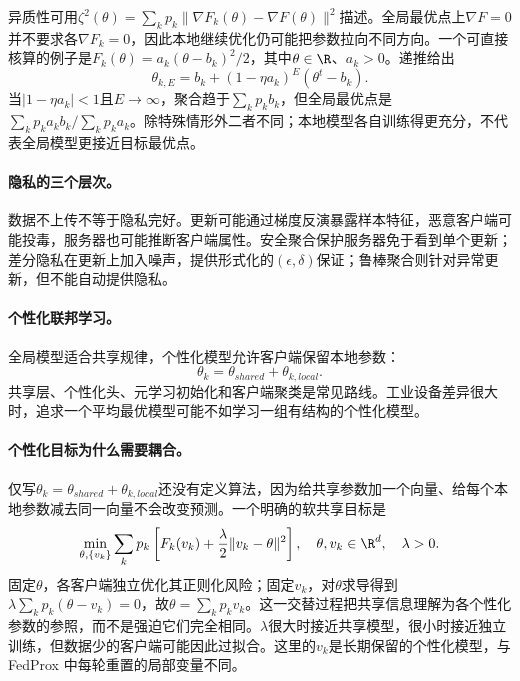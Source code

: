 异质性可用$\zeta^2(\theta)=\sum_kp_k\|\nabla F_k(\theta)-\nabla F(\theta)\|^2$描述。全局最优点上$\nabla F=0$并不要求各$\nabla F_k=0$，因此本地继续优化仍可能把参数拉向不同方向。一个可直接核算的例子是$F_k(\theta)=a_k(\theta-b_k)^2/2$，其中$\theta\in\R$、$a_k>0$。递推给出
\begin{equation}
 \theta_{k,E}=b_k+(1-\eta a_k)^E(\theta^t-b_k).
\end{equation}
当$|1-\eta a_k|<1$且$E\to\infty$，聚合趋于$\sum_kp_kb_k$，但全局最优点是$\sum_kp_ka_kb_k/\sum_kp_ka_k$。除特殊情形外二者不同；本地模型各自训练得更充分，不代表全局模型更接近目标最优点。

\paragraph{隐私的三个层次。}
数据不上传不等于隐私完好。更新可能通过梯度反演暴露样本特征，恶意客户端可能投毒，服务器也可能推断客户端属性。安全聚合保护服务器免于看到单个更新；差分隐私在更新上加入噪声，提供形式化的$(\epsilon,\delta)$保证；鲁棒聚合则针对异常更新，但不能自动提供隐私。

\paragraph{个性化联邦学习。}
全局模型适合共享规律，个性化模型允许客户端保留本地参数：
\begin{equation}
 \theta_k=\theta_{shared}+\theta_{k,local}.
\end{equation}
共享层、个性化头、元学习初始化和客户端聚类是常见路线。工业设备差异很大时，追求一个平均最优模型可能不如学习一组有结构的个性化模型。

\paragraph{个性化目标为什么需要耦合。}
仅写$\theta_k=\theta_{shared}+\theta_{k,local}$还没有定义算法，因为给共享参数加一个向量、给每个本地参数减去同一向量不会改变预测。一个明确的软共享目标是
\begin{equation}
 \min_{\theta,\{v_k\}}\sum_kp_k
 \left[F_k(v_k)+\frac\lambda2\|v_k-\theta\|^2\right],
 \quad \theta,v_k\in\R^d,\quad\lambda>0.
\end{equation}
固定$\theta$，各客户端独立优化其正则化风险；固定$v_k$，对$\theta$求导得到$\lambda\sum_kp_k(\theta-v_k)=0$，故$\theta=\sum_kp_kv_k$。这一交替过程把共享信息理解为各个性化参数的参照，而不是强迫它们完全相同。$\lambda$很大时接近共享模型，很小时接近独立训练，但数据少的客户端可能因此过拟合。这里的$v_k$是长期保留的个性化模型，与 FedProx 中每轮重置的局部变量不同。

